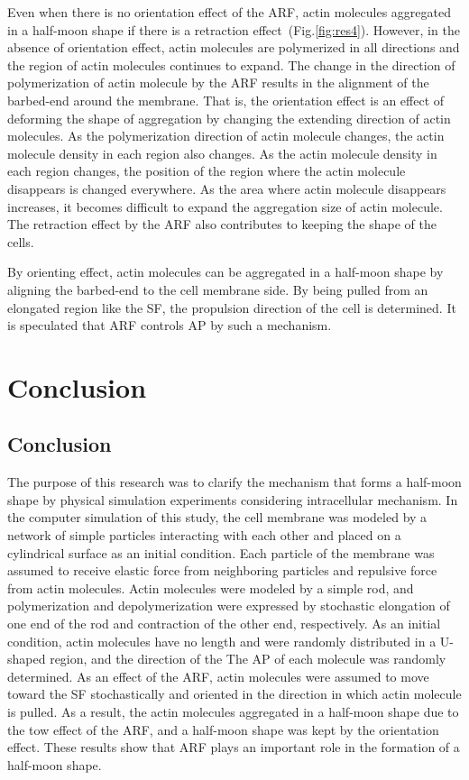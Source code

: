 \documentclass[a4paper,12pt, oneside]{book}
\begin{document}
Even when there is no orientation effect of the ARF, actin molecules aggregated in a half-moon shape if there is a retraction effect~(Fig.\ref{fig:res4}).
However, in the absence of orientation effect, actin molecules are polymerized in all directions and the region of actin molecules continues to expand.
The change in the direction of polymerization of actin molecule by the ARF results in the alignment of the barbed-end around the membrane.
That is, the orientation effect is an effect of deforming the shape of aggregation by changing the extending direction of actin molecules.
As the polymerization direction of actin molecule changes, the actin molecule density in each region also changes.
As the actin molecule density in each region changes, the position of the region where the actin molecule disappears is changed everywhere.
As the area where actin molecule disappears increases, it becomes difficult to expand the aggregation size of actin molecule.
The retraction effect by the ARF also contributes to keeping the shape of the cells.

By orienting effect, actin molecules can be aggregated in a half-moon shape by aligning the barbed-end to the cell membrane side.
By being pulled from an elongated region like the SF, the propulsion direction of the cell is determined.
It is speculated that ARF controls AP by such a mechanism.

\chapter{Conclusion}
\section{Conclusion}
The purpose of this research was to clarify the mechanism that forms a half-moon shape by physical simulation experiments considering intracellular mechanism.
In the computer simulation of this study, the cell membrane was modeled by a network of simple particles interacting with each other and placed on a cylindrical surface as an initial condition.
Each particle of the membrane was assumed to receive elastic force from neighboring particles and repulsive force from actin molecules.
Actin molecules were modeled by a simple rod, and polymerization and depolymerization were expressed by stochastic elongation of one end of the rod and contraction of the other end, respectively.
As an initial condition, actin molecules have no length and were randomly distributed in a U-shaped region, and the direction of the The AP of each molecule was randomly determined.
As an effect of the ARF, actin molecules were assumed to move toward the SF stochastically and oriented in the direction in which actin molecule is pulled.
As a result, the actin molecules aggregated in a half-moon shape due to the tow effect of the ARF, and a half-moon shape was kept by the orientation effect.
These results show that ARF plays an important role in the formation of a half-moon shape.
\end{document}
